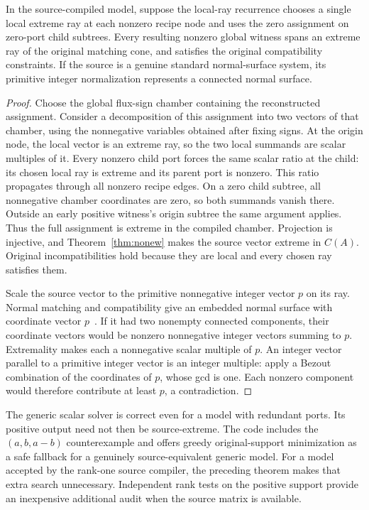 \begin{theorem}
\label{thm:gluing}
In the source-compiled model, suppose the local-ray recurrence chooses a single
local extreme ray at each nonzero recipe node and uses the zero assignment on
zero-port child subtrees. Every resulting nonzero global witness spans an
extreme ray of the original matching cone, and satisfies the original
compatibility constraints. If the source is a genuine standard normal-surface
system, its primitive integer normalization represents a connected normal
surface.
\end{theorem}

\begin{proof}
Choose the global flux-sign chamber containing the reconstructed assignment.
Consider a decomposition of this assignment into two vectors of that chamber,
using the nonnegative variables obtained after fixing signs. At the origin
node, the local vector is an extreme ray, so the two local summands are scalar
multiples of it. Every nonzero child port forces the same scalar ratio at the
child: its chosen local ray is extreme and its parent port is nonzero. This
ratio propagates through all nonzero recipe edges. On a zero child subtree,
all nonnegative chamber coordinates are zero, so both summands vanish there.
Outside an early positive witness's origin subtree the same argument applies.
Thus the full assignment is extreme in the compiled chamber. Projection is
injective, and Theorem~\ref{thm:nonew} makes the source vector extreme in $C(A)$.
Original incompatibilities hold because they are local and every chosen ray
satisfies them.

Scale the source vector to the primitive nonnegative integer vector $p$ on its
ray. Normal matching and compatibility give an embedded normal surface with
coordinate vector $p$~\cite{haken}. If it had two nonempty connected components,
their coordinate vectors would be nonzero nonnegative integer vectors summing
to $p$. Extremality makes each a nonnegative scalar multiple of $p$. An integer
vector parallel to a primitive integer vector is an integer multiple: apply a
Bezout combination of the coordinates of $p$, whose gcd is one. Each nonzero
component would therefore contribute at least $p$, a contradiction.
\end{proof}

\begin{remark}
The generic scalar solver is correct even for a model with redundant ports.
Its positive output need not then be source-extreme. The code includes the
$(a,b,a-b)$ counterexample and offers greedy original-support minimization as
a safe fallback for a genuinely source-equivalent generic model. For a model
accepted by the rank-one source compiler, the preceding theorem makes that
extra search unnecessary. Independent rank tests on the positive support
provide an inexpensive additional audit when the source matrix is available.
\end{remark}
